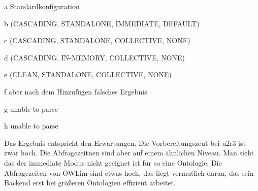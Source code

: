 \begin{table}[htbp]
\begin{center}
\begin{threeparttable}
\begin{tabular}{l|r|r|r|r|r|r|}
\end{tabular}
\begin{tablenotes}
	\item[a] Standardkonfiguration
	\item[b] (CASCADING, STANDALONE, IMMEDIATE, DEFAULT)
	\item[c] (CASCADING, STANDALONE, COLLECTIVE, NONE)
	\item[d] (CASCADING, IN-MEMORY, COLLECTIVE, NONE)
	\item[e] (CLEAN, STANDALONE, COLLECTIVE, NONE)
	\item[f] aber nach dem Hinzufügen falsches Ergebnis
	\item[g] unable to parse
	\item[h] unable to parse
\end{tablenotes}
\end{threeparttable}
\end{center}
\end{table}

Das Ergebnis entspricht den Erwartungen. Die Vorbereitungszeut bei u2r3 ist zwar hoch. Die Abfragezeitnen sind aber auf einem ähnlichen Niveau.
Man sieht das der immediate Modus nicht geeignet ist für so eine Ontologie. Die Abfragezeiten von OWLim sind etwas hoch, das liegt vermutlich daran, das sein Backend erst bei größeren Ontologien effizient arbeitet.

